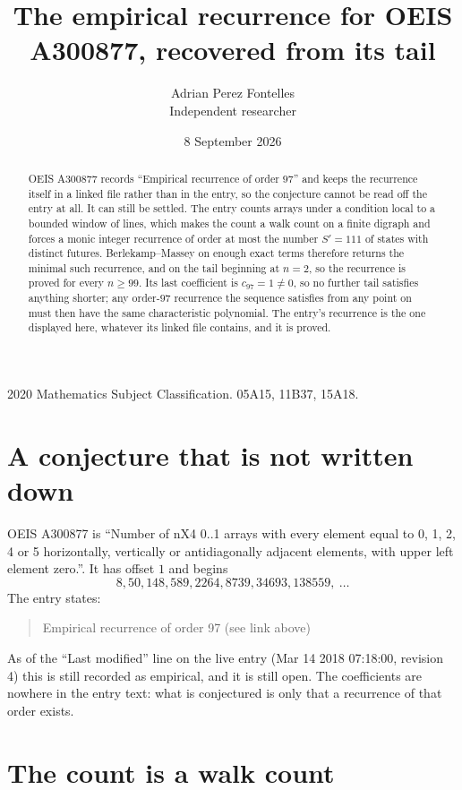 \documentclass[11pt,a4paper]{article}
\title{The empirical recurrence for OEIS A300877, recovered from its tail}
\author{Adrian Perez Fontelles\\ \small Independent researcher}
\date{8 September 2026}
\theoremstyle{plain}
\theoremstyle{definition}
\begin{document}
\maketitle

\begin{abstract}
OEIS A300877 records ``Empirical recurrence of order $97$'' and keeps the recurrence itself in
a linked file rather than in the entry, so the conjecture cannot be read off the entry at all.
It can still be settled. The entry counts arrays under a condition local to a bounded window of
lines, which makes the count a walk count on a finite digraph and forces a monic integer
recurrence of order at most the number $S'=111$ of states with distinct futures. Berlekamp--Massey on
enough exact terms therefore returns the minimal such recurrence, and on the tail beginning at $n=2$, so the recurrence is proved for every $n\ge99$.
Its last coefficient is $c_{97}=1\neq0$, so no further tail satisfies anything
shorter; any order-$97$ recurrence the sequence satisfies from any point on must then have
the same characteristic polynomial. The entry's recurrence is the one displayed here, whatever
its linked file contains, and it is proved.
\end{abstract}

\noindent\small 2020 Mathematics Subject Classification. 05A15, 11B37, 15A18.\normalsize

\section{A conjecture that is not written down}

OEIS A300877 is ``Number of nX4 0..1 arrays with every element equal to 0, 1, 2, 4 or 5 horizontally, vertically or antidiagonally adjacent elements, with upper left element zero.''. It has offset $1$ and begins
\[
8, 50, 148, 589, 2264, 8739, 34693, 138559,\ \dots
\]
The entry states:
\begin{quote}
Empirical recurrence of order 97 (see link above)
\end{quote}
As of the ``Last modified'' line on the live entry (Mar 14 2018 07:18:00, revision 4)
this is still recorded as empirical, and it is still open. The coefficients are nowhere in the
entry text: what is conjectured is only that a recurrence of that order exists.

\section{The count is a walk count}
\end{document}
